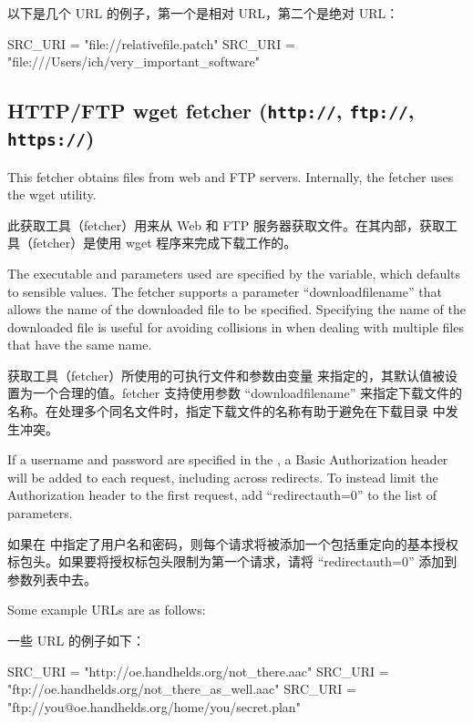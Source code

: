 以下是几个 URL 的例子，第一个是相对 URL，第二个是绝对 URL：

\begin{pyglist}
SRC_URI = "file://relativefile.patch"
SRC_URI = "file:///Users/ich/very_important_software"
\end{pyglist}

\subsection{HTTP/FTP wget fetcher (\texttt{http://}, \texttt{ftp://}, \texttt{https://})}

This fetcher obtains files from web and FTP servers. Internally, the fetcher uses the wget utility.

此获取工具（fetcher）用来从 Web 和 FTP 服务器获取文件。在其内部，获取工具（fetcher）是使用 wget 程序来完成下载工作的。


The executable and parameters used are specified by the  variable, which defaults to sensible values. The fetcher supports a parameter ``downloadfilename'' that allows the name of the downloaded file to be specified. Specifying the name of the downloaded file is useful for avoiding collisions in  when dealing with multiple files that have the same name.

获取工具（fetcher）所使用的可执行文件和参数由变量  来指定的，其默认值被设置为一个合理的值。fetcher 支持使用参数 ``downloadfilename'' 来指定下载文件的名称。在处理多个同名文件时，指定下载文件的名称有助于避免在下载目录  中发生冲突。

If a username and password are specified in the , a Basic Authorization header will be added to each request, including across redirects. To instead limit the Authorization header to the first request, add ``redirectauth=0'' to the list of parameters.

如果在  中指定了用户名和密码，则每个请求将被添加一个包括重定向的基本授权标包头。如果要将授权标包头限制为第一个请求，请将 ``redirectauth=0'' 添加到参数列表中去。

Some example URLs are as follows:

一些 URL 的例子如下：

\begin{pyglist}
SRC_URI = "http://oe.handhelds.org/not_there.aac"
SRC_URI = "ftp://oe.handhelds.org/not_there_as_well.aac"
SRC_URI = "ftp://you@oe.handhelds.org/home/you/secret.plan"
\end{pyglist}

